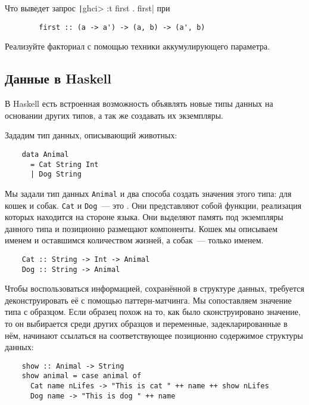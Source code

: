 \begin{task}
    Что выведет запрос \texttt|ghci> :t first . first| при
    \begin{verbatim}
        first :: (a -> a') -> (a, b) -> (a', b)
    \end{verbatim}
\end{task}

\begin{task}
    Реализуйте факториал с помощью техники аккумулирующего параметра.
\end{task}

\subsection{Данные в Haskell}

В Haskell есть встроенная возможность объявлять новые типы данных на основании других типов, а так же создавать их экземпляры.

Зададим тип данных, описывающий животных:
\begin{verbatim}
    data Animal
      = Cat String Int
      | Dog String
\end{verbatim}

Мы задали тип данных \texttt{Animal} и два способа создать значения этого типа: для кошек и собак.
\texttt{Cat} и \texttt{Dog}~--- это .
Они представляют собой функции, реализация которых находится на стороне языка.
Они выделяют память под экземпляры данного типа и позиционно размещают компоненты.
Кошек мы описываем именем и оставшимся количеством жизней, а собак~--- только именем.
\begin{verbatim}
    Cat :: String -> Int -> Animal
    Dog :: String -> Animal
\end{verbatim}

Чтобы воспользоваться информацией, сохранённой в структуре данных, требуется деконструировать её с помощью паттерн-матчинга.
Мы сопоставляем значение типа с образцом.
Если образец похож на то, как было сконструировано значение, то он выбирается среди других образцов и переменные, задекларированные в нём, начинают ссылаться на соответствующее позиционно содержимое структуры данных:
\begin{verbatim}
    show :: Animal -> String
    show animal = case animal of
      Cat name nLifes -> "This is cat " ++ name ++ show nLifes
      Dog name -> "This is dog " ++ name
\end{verbatim}

